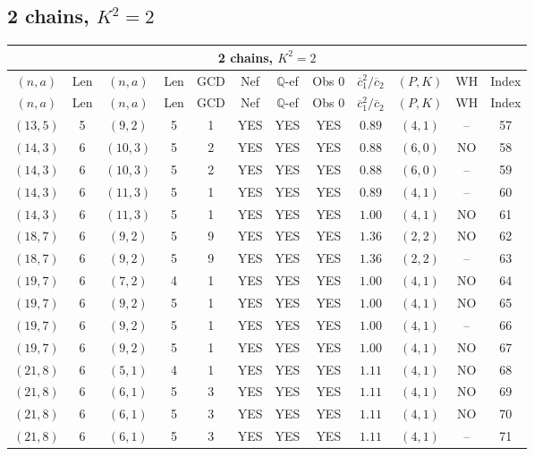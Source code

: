 \subsection{2 chains, $K^2 = 2$}
\begin{longtable}{|c|c|c|c|c|c|c|c|c|c|c|c|}
\hline
\multicolumn{12}{|c|}{2 chains, $K^2 = 2$}\\
\hline
$(n,a)$ & Len & $(n,a)$ & Len & GCD & Nef & $\mathbb Q$-ef & Obs 0 & $\overline c_1^2 / \overline c_2$ & $(P,K)$ & WH & Index\\
\hline
\endfirsthead

\hline
$(n,a)$ & Len & $(n,a)$ & Len & GCD & Nef & $\mathbb Q$-ef & Obs 0 & $\overline c_1^2 / \overline c_2$ & $(P,K)$ & WH & Index\\
\hline
\endhead
\hline
\endfoot

$(13,5)$ & 5 & $(9,2)$ & 5 & 1 & YES & YES & YES & $0.89$ & $(4,1)$ & -- & 57\\
$(14,3)$ & 6 & $(10,3)$ & 5 & 2 & YES & YES & YES & $0.88$ & $(6,0)$ & NO & 58\\
$(14,3)$ & 6 & $(10,3)$ & 5 & 2 & YES & YES & YES & $0.88$ & $(6,0)$ & -- & 59\\
$(14,3)$ & 6 & $(11,3)$ & 5 & 1 & YES & YES & YES & $0.89$ & $(4,1)$ & -- & 60\\
$(14,3)$ & 6 & $(11,3)$ & 5 & 1 & YES & YES & YES & $1.00$ & $(4,1)$ & NO & 61\\
$(18,7)$ & 6 & $(9,2)$ & 5 & 9 & YES & YES & YES & $1.36$ & $(2,2)$ & NO & 62\\
$(18,7)$ & 6 & $(9,2)$ & 5 & 9 & YES & YES & YES & $1.36$ & $(2,2)$ & -- & 63\\
$(19,7)$ & 6 & $(7,2)$ & 4 & 1 & YES & YES & YES & $1.00$ & $(4,1)$ & NO & 64\\
$(19,7)$ & 6 & $(9,2)$ & 5 & 1 & YES & YES & YES & $1.00$ & $(4,1)$ & NO & 65\\
$(19,7)$ & 6 & $(9,2)$ & 5 & 1 & YES & YES & YES & $1.00$ & $(4,1)$ & -- & 66\\
$(19,7)$ & 6 & $(9,2)$ & 5 & 1 & YES & YES & YES & $1.00$ & $(4,1)$ & NO & 67\\
$(21,8)$ & 6 & $(5,1)$ & 4 & 1 & YES & YES & YES & $1.11$ & $(4,1)$ & NO & 68\\
$(21,8)$ & 6 & $(6,1)$ & 5 & 3 & YES & YES & YES & $1.11$ & $(4,1)$ & NO & 69\\
$(21,8)$ & 6 & $(6,1)$ & 5 & 3 & YES & YES & YES & $1.11$ & $(4,1)$ & NO & 70\\
$(21,8)$ & 6 & $(6,1)$ & 5 & 3 & YES & YES & YES & $1.11$ & $(4,1)$ & -- & 71\\

\end{longtable}
